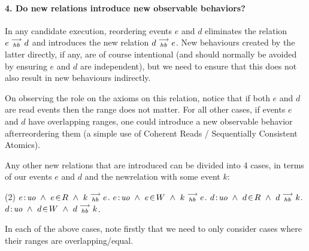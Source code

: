 
\paragraph{4. Do new relations introduce new observable behaviors?}
    In any candidate execution, reordering events $e$ and $d$ eliminates the relation $e\stackrel{\longrightarrow}{_{hb}}d$ and introduces the new relation $d\stackrel{\longrightarrow}{_{hb}}e$. 
    New behaviours created by the latter directly, if any, are 
    of course intentional (and should normally be avoided by ensuring $e$ and $d$ are independent), but we need to ensure that this does not also result in new behaviours indirectly. 
    
    On observing the role on the axioms on this relation, notice that if both $e$ and $d$ are read events then the range does not matter. For all other cases, if events $e$ and $d$ have overlapping ranges, one could introduce a new observable behavior afterreordering them (a simple use of Coherent Reads / Sequentially Consistent Atomics).     

    
    Any other new relations that are introduced can be divided into 4 cases, in terms of our events $e$ and $d$ and the newrelation with some event $k$:
    \begin{tasks}(2)
        \task  $\et{e}{uo} \ \wedge \ \event{e}{R} \ \wedge \ \reln{k}{hb}{e}$.
        \task  $e\!:\!\textit{uo} \ \wedge \  e\!\in\!W \ \wedge \ k\stackrel{\longrightarrow}{_{hb}}e$.
        \task  $\et{d}{uo} \ \wedge \  \event{d}{R} \ \wedge \ \reln{d}{hb}{k}$.
        \task  $d\!:\!\textit{uo} \ \wedge \ d\!\in\!W \ \wedge \ d\stackrel{\longrightarrow}{_{hb}}k$.
    \end{tasks}
    
    In each of the above cases, note firstly that we need to only consider cases where their ranges are overlapping/equal.
    
